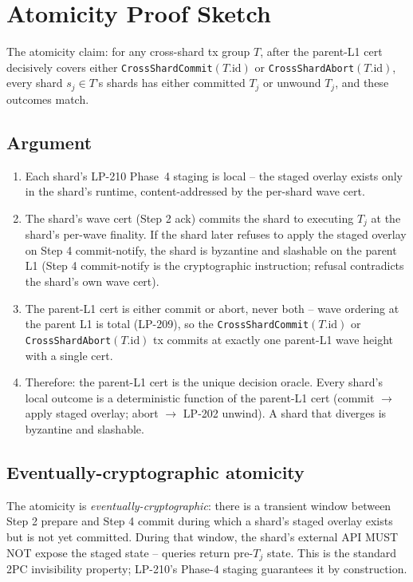 \section{Atomicity Proof Sketch}

The atomicity claim: for any cross-shard tx group $T$, after the
parent-L1 cert decisively covers either
\texttt{CrossShardCommit}$(T.\textrm{id})$ or
\texttt{CrossShardAbort}$(T.\textrm{id})$, every shard
$s_j \in T$'s shards has either committed $T_j$ or unwound $T_j$,
and these outcomes match.

\subsection{Argument}

\begin{enumerate}[leftmargin=2em,nosep]
\item Each shard's LP-210 Phase~4 staging is local -- the staged
  overlay exists only in the shard's runtime, content-addressed by
  the per-shard wave cert.

\item The shard's wave cert (Step 2 ack) commits the shard to
  executing $T_j$ at the shard's per-wave finality. If the shard
  later refuses to apply the staged overlay on Step 4
  commit-notify, the shard is byzantine and slashable on the parent
  L1 (Step 4 commit-notify is the cryptographic instruction;
  refusal contradicts the shard's own wave cert).

\item The parent-L1 cert is either commit or abort, never both --
  wave ordering at the parent L1 is total (LP-209), so the
  \texttt{CrossShardCommit}$(T.\textrm{id})$ or
  \texttt{CrossShardAbort}$(T.\textrm{id})$ tx commits at exactly
  one parent-L1 wave height with a single cert.

\item Therefore: the parent-L1 cert is the unique decision oracle.
  Every shard's local outcome is a deterministic function of the
  parent-L1 cert (commit $\to$ apply staged overlay; abort $\to$
  LP-202 unwind). A shard that diverges is byzantine and
  slashable.
\end{enumerate}

\subsection{Eventually-cryptographic atomicity}

The atomicity is \emph{eventually-cryptographic}: there is a
transient window between Step 2 prepare and Step 4 commit during
which a shard's staged overlay exists but is not yet committed.
During that window, the shard's external API MUST NOT expose the
staged state -- queries return pre-$T_j$ state. This is the
standard 2PC invisibility property; LP-210's Phase-4 staging
guarantees it by construction.


